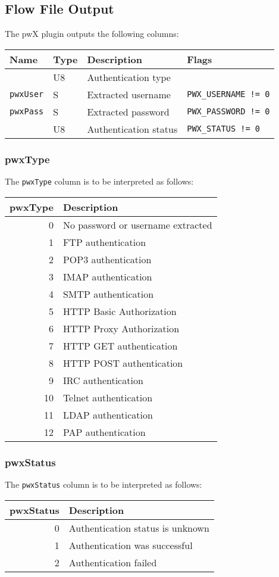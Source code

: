 \documentclass[documentation]{subfiles}
\begin{document}
\subsection{Flow File Output}
The pwX plugin outputs the following columns:
\begin{longtable}{llll}
    \toprule
    {\bf Name} & {\bf Type} & {\bf Description} & {\bf Flags}\\
    \midrule\endhead%
    {\tt \nameref{pwxType}} & U8 & Authentication type\\
    {\tt pwxUser} & S & Extracted username & {\tt PWX\_USERNAME != 0}\\
    {\tt pwxPass} & S & Extracted password & {\tt PWX\_PASSWORD != 0}\\
    {\tt \nameref{pwxStatus}} & U8 & Authentication status & {\tt PWX\_STATUS != 0}\\
    \bottomrule
\end{longtable}

\subsubsection{pwxType}\label{pwxType}
The {\tt pwxType} column is to be interpreted as follows:
\begin{longtable}{rl}
    \toprule
    {\bf pwxType} & {\bf Description}\\
    \midrule\endhead%
     0 & No password or username extracted\\
     1 & FTP authentication\\
     2 & POP3 authentication\\
     3 & IMAP authentication\\
     4 & SMTP authentication\\
     5 & HTTP Basic Authorization\\
     6 & HTTP Proxy Authorization\\
     7 & HTTP GET authentication\\
     8 & HTTP POST authentication \\
     9 & IRC authentication \\
    10 & Telnet authentication \\
    11 & LDAP authentication \\
    12 & PAP authentication \\
    \bottomrule
\end{longtable}

\subsubsection{pwxStatus}\label{pwxStatus}
The {\tt pwxStatus} column is to be interpreted as follows:
\begin{longtable}{rl}
    \toprule
    {\bf pwxStatus} & {\bf Description}\\
    \midrule\endhead%
    0 & Authentication status is unknown\\
    1 & Authentication was successful\\
    2 & Authentication failed\\
    \bottomrule
\end{longtable}
\end{document}
